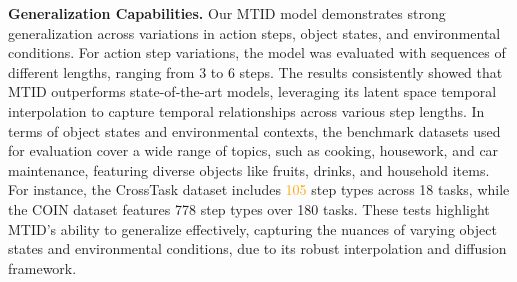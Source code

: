 \textbf{Generalization Capabilities.} Our MTID model demonstrates strong generalization across variations in action steps, object states, and environmental conditions. 
For action step variations, the model was evaluated with sequences of different lengths, ranging from 3 to 6 steps. 
The results consistently showed that MTID outperforms state-of-the-art models, leveraging its latent space temporal interpolation to capture temporal relationships across various step lengths. 
In terms of object states and environmental contexts, the benchmark datasets used for evaluation cover a wide range of topics, such as cooking, housework, and car maintenance, featuring diverse objects like fruits, drinks, and household items. 
For instance, the CrossTask dataset includes \textcolor{orange}{105} step types across 18 tasks, while the COIN dataset features 778 step types over 180 tasks. 
These tests highlight MTID's ability to generalize effectively, capturing the nuances of varying object states and environmental conditions, due to its robust interpolation and diffusion framework.

